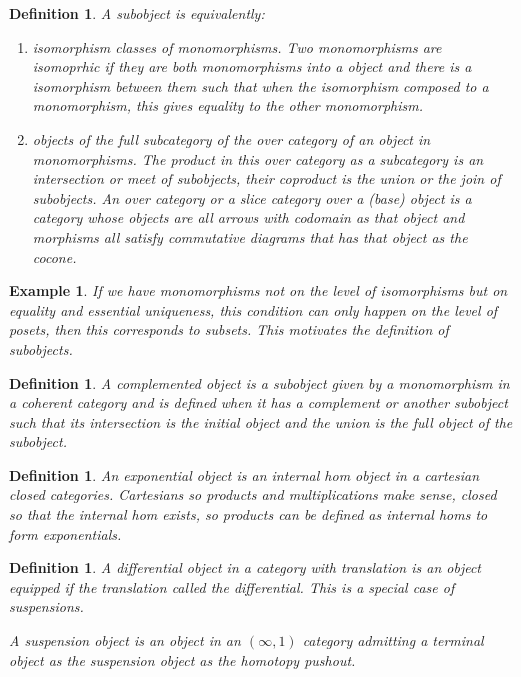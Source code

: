 \documentclass{tufte-book}
\newtheorem{definition}[theorem]{Definition}
\newtheorem{example}[theorem]{Example}
\begin{document}
 \begin{definition}
     A subobject is equivalently:
     \begin{enumerate}
         \item isomorphism classes of monomorphisms. Two monomorphisms are isomoprhic if they are both monomorphisms into a object and there is a isomorphism between them such that when the isomorphism composed to a monomorphism, this gives equality to the other monomorphism.
         \item objects of the full subcategory of the over category of an object in monomorphisms. The product in this over category as a subcategory is an intersection or meet of subobjects, their coproduct is the union or the join of subobjects. An over category or a slice category over a (base) object is a category whose objects are all arrows with codomain as that object and morphisms all satisfy commutative diagrams that has that object as the cocone.
     \end{enumerate}
 \end{definition}
 
 \begin{example}
 	If we have monomorphisms not on the level of isomorphisms but on equality and essential uniqueness, this condition can only happen on the level of posets, then this corresponds to subsets. This motivates the definition of subobjects.
 \end{example}
 
 \begin{definition}
     A complemented object is a subobject given by a monomorphism in a coherent category and is defined when it has a complement or another subobject such that its intersection is the initial object and the union is the full object of the subobject.
 \end{definition}
 
 \begin{definition}
     An exponential object is an internal hom object in a cartesian closed categories. Cartesians so products and multiplications make sense, closed so that the internal hom exists, so products can be defined as internal homs to form exponentials.
 \end{definition}
 
 \begin{definition}
     A differential object in a category with translation is an object equipped if the translation called the differential. This is a special case of suspensions.
 
     A suspension object is an object in an $(\infty,1)$ category admitting a terminal object as the suspension object as the homotopy pushout.
 \end{definition}
 
\end{document}

